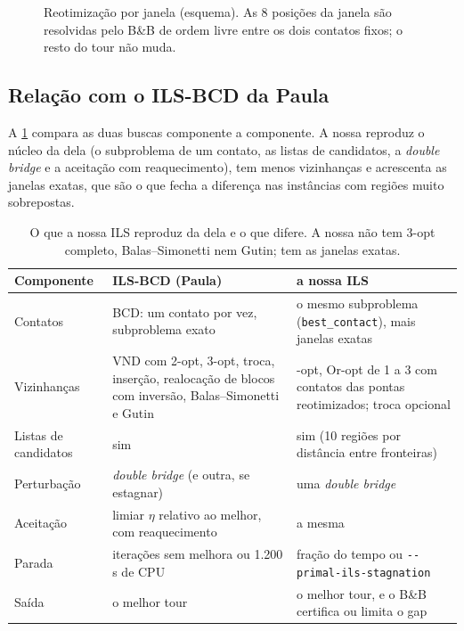 \documentclass[11pt,a4paper]{article}
\theoremstyle{plain}\newtheorem{proposicao}{Proposição}
\theoremstyle{definition}\newtheorem{definicao}{Definição}
\theoremstyle{plain}\newtheorem{teorema}{Teorema}
\theoremstyle{plain}\newtheorem{lema}{Lema}
\newcommand{\code}[1]{\texttt{\small #1}}
\begin{document}
\begin{figure}[ht]\centering\figjanela
\caption{Reotimização por janela (esquema). As 8 posições da janela são resolvidas pelo B\&B de ordem livre entre os dois contatos fixos; o resto do tour não muda.}\label{fig:janela}
\end{figure}

\subsection{Relação com o ILS-BCD da Paula}
A \cref{tab:paula} compara as duas buscas componente a componente. A nossa reproduz o núcleo da dela (o subproblema de um contato, as listas de candidatos, a \emph{double bridge} e a aceitação com reaquecimento), tem menos vizinhanças e acrescenta as janelas exatas, que são o que fecha a diferença nas instâncias com regiões muito sobrepostas.

\begin{table}[ht]\centering\small
\begin{tabular}{@{}>{\raggedright\arraybackslash}p{33mm}>{\raggedright\arraybackslash}p{55mm}>{\raggedright\arraybackslash}p{56mm}@{}}\toprule
Componente & ILS-BCD (Paula) & a nossa ILS\\\midrule
Contatos & BCD: um contato por vez, subproblema exato & o mesmo subproblema (\code{best\_contact}), mais janelas exatas\\
Vizinhanças & VND com 2-opt, 3-opt, troca, inserção, realocação de blocos com inversão, Balas--Simonetti e Gutin & 2-opt, Or-opt de 1 a 3 com contatos das pontas reotimizados; troca opcional\\
Listas de candidatos & sim & sim (10 regiões por distância entre fronteiras)\\
Perturbação & \emph{double bridge} (e outra, se estagnar) & uma \emph{double bridge}\\
Aceitação & limiar \(\eta\) relativo ao melhor, com reaquecimento & a mesma\\
Parada & 3.000 iterações sem melhora ou 1.200 s de CPU & fração do tempo ou \code{-{}-primal-ils-stagnation}\\
Saída & o melhor tour & o melhor tour, e o B\&B certifica ou limita o gap\\\bottomrule
\end{tabular}
\caption{O que a nossa ILS reproduz da dela e o que difere. A nossa não tem 3-opt completo, Balas--Simonetti nem Gutin; tem as janelas exatas.}\label{tab:paula}
\end{table}
\end{document}
